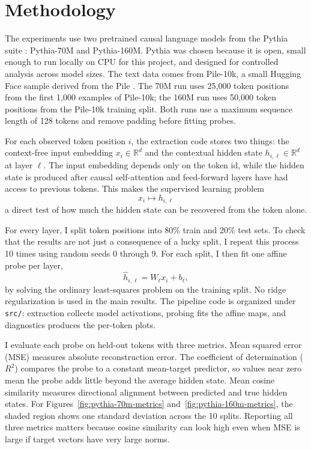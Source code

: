 \documentclass[10pt]{article}
\begin{document}
\section{Methodology}
The experiments use two pretrained causal language models from the Pythia suite \cite{biderman2023pythia}: Pythia-70M and Pythia-160M. Pythia was chosen because it is open, small enough to run locally on CPU for this project, and designed for controlled analysis across model sizes. The text data comes from Pile-10k, a small Hugging Face sample derived from the Pile \cite{gao2020pile}. The 70M run uses 25,000 token positions from the first 1,000 examples of Pile-10k; the 160M run uses 50,000 token positions from the Pile-10k training split. Both runs use a maximum sequence length of 128 tokens and remove padding before fitting probes.

For each observed token position $i$, the extraction code stores two things: the context-free input embedding $x_i \in \mathbb{R}^d$ and the contextual hidden state $h_{i,\ell} \in \mathbb{R}^d$ at layer $\ell$. The input embedding depends only on the token id, while the hidden state is produced after causal self-attention and feed-forward layers have had access to previous tokens. This makes the supervised learning problem
\[
    x_i \mapsto h_{i,\ell}
\]
a direct test of how much the hidden state can be recovered from the token alone.

For every layer, I split token positions into 80\% train and 20\% test sets. To check that the results are not just a consequence of a lucky split, I repeat this process 10 times using random seeds 0 through 9. For each split, I then fit one affine probe per layer,
\[
    \hat{h}_{i,\ell} = W_\ell x_i + b_\ell,
\]
by solving the ordinary least-squares problem on the training split. No ridge regularization is used in the main results. The pipeline code is organized under \texttt{src/}: extraction collects model activations, probing fits the affine maps, and diagnostics produces the per-token plots.

I evaluate each probe on held-out tokens with three metrics. Mean squared error (MSE) measures absolute reconstruction error. The coefficient of determination ($R^2$) compares the probe to a constant mean-target predictor, so values near zero mean the probe adds little beyond the average hidden state. Mean cosine similarity measures directional alignment between predicted and true hidden states. For Figures~\ref{fig:pythia-70m-metrics} and~\ref{fig:pythia-160m-metrics}, the shaded region shows one standard deviation across the 10 splits. Reporting all three metrics matters because cosine similarity can look high even when MSE is large if target vectors have very large norms.
\end{document}
